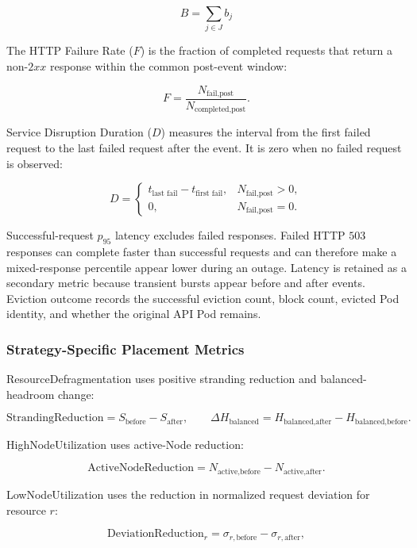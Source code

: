 \[
B
=
\sum_{j \in J} b_j
\]

The HTTP Failure Rate (\(F\)) is the fraction of completed requests that return a non-\(2xx\) response within the common post-event window:

\[
F
=
\frac{N_{\text{fail,post}}}{N_{\text{completed,post}}}.
\]

Service Disruption Duration (\(D\)) measures the interval from the first failed request to the last failed request after the event. It is zero when no failed request is observed:

\[
D =
\begin{cases}
t_{\text{last fail}} - t_{\text{first fail}}, & N_{\text{fail,post}} > 0,\\
0, & N_{\text{fail,post}} = 0.
\end{cases}
\]

Successful-request \(p_{95}\) latency excludes failed responses. Failed HTTP \(503\) responses can complete faster than successful requests and can therefore make a mixed-response percentile appear lower during an outage. Latency is retained as a secondary metric because transient bursts appear before and after events. Eviction outcome records the successful eviction count, block count, evicted Pod identity, and whether the original API Pod remains.

\subsubsection{Strategy-Specific Placement Metrics}
\label{subsubsec:actualusage4_metric_strandingdelta}
ResourceDefragmentation uses positive stranding reduction and balanced-headroom change:

\[
\mathrm{StrandingReduction}
=
S_{\text{before}} - S_{\text{after}},
\qquad
\Delta H_{\text{balanced}}
=
H_{\text{balanced,after}} - H_{\text{balanced,before}}.
\]

HighNodeUtilization uses active-Node reduction:

\[
\mathrm{ActiveNodeReduction}
=
N_{\text{active,before}} - N_{\text{active,after}}.
\]

LowNodeUtilization uses the reduction in normalized request deviation for resource \(r\):

\[
\mathrm{DeviationReduction}_{r}
=
\sigma_{r,\text{before}} - \sigma_{r,\text{after}},
\]

